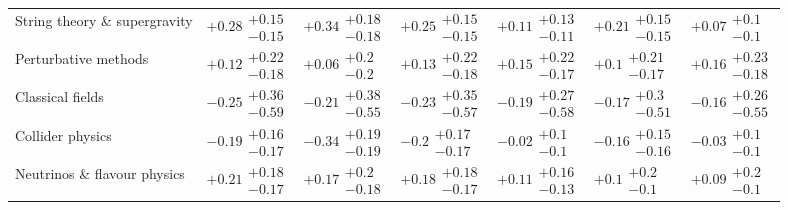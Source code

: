 \begin{table}[H]
\begin{tabular}{lllllll}
String theory \& supergravity & $\bm{+0.28}\substack{+0.15 \\ -0.15}$ & $\bm{+0.34}\substack{+0.18 \\ -0.18}$ & $\bm{+0.25}\substack{+0.15 \\ -0.15}$ & $+0.11\substack{+0.13 \\ -0.11}$ & $\bm{+0.21}\substack{+0.15 \\ -0.15}$ & $+0.07\substack{+0.1 \\ -0.1}$ \\
Perturbative methods & $+0.12\substack{+0.22 \\ -0.18}$ & $+0.06\substack{+0.2 \\ -0.2}$ & $+0.13\substack{+0.22 \\ -0.18}$ & $+0.15\substack{+0.22 \\ -0.17}$ & $+0.1\substack{+0.21 \\ -0.17}$ & $+0.16\substack{+0.23 \\ -0.18}$ \\
Classical fields & $-0.25\substack{+0.36 \\ -0.59}$ & $-0.21\substack{+0.38 \\ -0.55}$ & $-0.23\substack{+0.35 \\ -0.57}$ & $-0.19\substack{+0.27 \\ -0.58}$ & $-0.17\substack{+0.3 \\ -0.51}$ & $-0.16\substack{+0.26 \\ -0.55}$ \\
Collider physics & $\bm{-0.19}\substack{+0.16 \\ -0.17}$ & $\bm{-0.34}\substack{+0.19 \\ -0.19}$ & $\bm{-0.2}\substack{+0.17 \\ -0.17}$ & $-0.02\substack{+0.1 \\ -0.1}$ & $\bm{-0.16}\substack{+0.15 \\ -0.16}$ & $-0.03\substack{+0.1 \\ -0.1}$ \\
Neutrinos \& flavour physics & $\bm{+0.21}\substack{+0.18 \\ -0.17}$ & $+0.17\substack{+0.2 \\ -0.18}$ & $\bm{+0.18}\substack{+0.18 \\ -0.17}$ & $+0.11\substack{+0.16 \\ -0.13}$ & $+0.1\substack{+0.2 \\ -0.1}$ & $+0.09\substack{+0.2 \\ -0.1}$ \\

\end{tabular}
\end{table}
